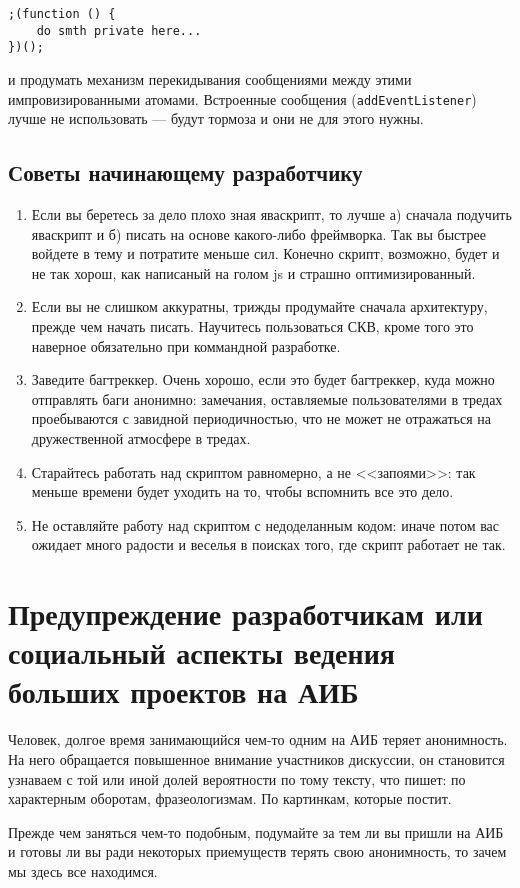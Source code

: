 \documentclass[12pt,a4paper]{article}
\begin{document}
\begin{verbatim}
;(function () {
    do smth private here...
})();
\end{verbatim}

и продумать механизм перекидывания сообщениями между этими импровизированными атомами. Встроенные сообщения ({\tt addEventListener}) лучше не использовать --- будут тормоза и они не для этого нужны.

\subsection{Советы начинающему разработчику}

\begin{enumerate}
\item Если вы беретесь за дело плохо зная яваскрипт, то лучше а) сначала подучить яваскрипт и б) писать на основе какого-либо фреймворка. Так вы быстрее войдете в тему и потратите меньше сил. Конечно скрипт, возможно, будет и не так хорош, как написаный на голом js и страшно оптимизированный.

\item Если вы не слишком аккуратны, трижды продумайте сначала архитектуру, прежде чем начать писать. Научитесь пользоваться СКВ, кроме того это наверное обязательно при коммандной разработке. 

\item Заведите багтреккер. Очень хорошо, если это будет багтреккер, куда можно отправлять баги анонимно: замечания, оставляемые пользователями в тредах проебываются с завидной периодичностью, что не может не отражаться на дружественной атмосфере в тредах.

\item Старайтесь работать над скриптом равномерно, а не <<запоями>>: так меньше времени будет уходить на то, чтобы вспомнить все это дело.

\item Не оставляйте работу над скриптом с недоделанным кодом: иначе потом вас ожидает много радости и веселья в поисках того, где скрипт работает не так.
\end{enumerate}

\section{Предупреждение разработчикам или социальный аспекты ведения больших проектов на АИБ}

Человек, долгое время занимающийся чем-то одним на АИБ теряет анонимность. На него обращается повышенное внимание участников дискуссии, он становится узнаваем с той или иной долей вероятности по тому тексту, что пишет: по характерным оборотам, фразеологизмам. По картинкам, которые постит.

Прежде чем заняться чем-то подобным, подумайте за тем ли вы пришли на АИБ и готовы ли вы ради некоторых приемуществ терять свою анонимность, то зачем мы здесь все находимся.
\end{document}
